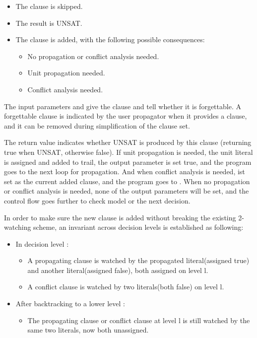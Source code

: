 \begin{itemize}
  \item The clause is skipped.
  \item The result is UNSAT.
  \item The clause is added, with the following possible consequences:
    \begin{itemize}
      \item No propagation or conflict analysis needed.
      \item Unit propagation needed.
      \item Conflict analysis needed.
    \end{itemize}
\end{itemize}

The input parameters  and  give the clause and tell whether it is forgettable. A forgettable clause is indicated by the user propagator when it provides a clause, and it can be removed during simplification of the clause set.

The return value  indicates whether UNSAT is produced by this clause (returning true when UNSAT, otherwise false). If unit propagation is needed, the unit literal is assigned and added to trail, the output parameter  is set true, and the program goes to the next loop for propagation. And when conflict analysis is needed,  ist set as the current added clause, and the program goes to . When no propagation or conflict analysis is needed, none of the output parameters will be set, and the control flow goes further to check model or the next decision.



In order to make sure the new clause is added without breaking the existing 2-watching scheme, an invariant across decision levels is established as following:

\begin{itemize}
  \item In decision level :
  \begin{itemize}
    \item A propagating clause is watched by the propagated literal(assigned true) and another literal(assigned false), both assigned on level l.
    \item A conflict clause is watched by two literals(both false) on level l.
  \end{itemize}
  \item After backtracking to a lower level :
  \begin{itemize}
    \item The propagating clause or conflict clause at level l is still watched by the same two literals, now both unassigned.
  \end{itemize}
\end{itemize}

